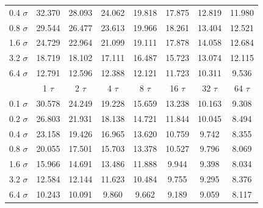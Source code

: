 \documentclass[preprint,12pt]{elsarticle}
\begin{document}
\begin{table}
\begin{tabular}{c || c c c c c c c}
0.4 $\sigma$	&	32.370 	&	28.093 	&	24.062 	&	19.818 	&	17.875 	&	 12.819 	&	11.980 	\\
0.8 $\sigma$	&	29.544 	&	26.477 	&	23.613 	&	19.966 	&	18.261 	&	 13.404 	&	12.521 	\\
1.6 $\sigma$	&	24.729 	&	22.964 	&	21.099 	&	19.111 	&	17.878 	&	 14.058 	&	12.684 	\\
3.2 $\sigma$	&	18.719 	&	18.102 	&	17.111 	&	16.487 	&	15.723 	&	 13.074 	&	12.115 	\\
6.4 $\sigma$	&	12.791 	&	12.596 	&	12.388 	&	12.121 	&	11.723 	&	 10.311 	&	9.536 	\\
\hline
\hline			
	&	1 $\tau$	&	2 $\tau$	&	4 $\tau$	&	8 $\tau$	&	16 $\tau$	 &	32 $\tau$	&	64 $\tau$	\\
\hline
0.1 $\sigma$	&	30.578 	&	24.249 	&	19.228 	&	15.659 	&	13.238 	&	 10.163 	&	9.308 	\\
0.2 $\sigma$	&	26.803 	&	21.931 	&	18.138 	&	14.721 	&	11.844 	&	 10.045 	&	8.494 	\\
0.4 $\sigma$	&	23.158 	&	19.426 	&	16.965 	&	13.620 	&	10.759 	&	 9.742 	&	8.355 	\\
0.8 $\sigma$	&	20.055 	&	17.501 	&	15.703 	&	13.378 	&	10.527 	&	 9.796 	&	8.069 	\\
1.6 $\sigma$	&	15.966 	&	14.691 	&	13.486 	&	11.888 	&	9.944 	&	 9.398 	&	8.034 	\\
3.2 $\sigma$	&	12.584 	&	12.144 	&	11.623 	&	10.484 	&	9.755 	&	 9.295 	&	8.376 	\\
6.4 $\sigma$	&	10.243 	&	10.091 	&	9.860 	&	9.662 	&	9.189 	&	 9.059 	&	8.117 	\\
\hline

\end{tabular}
\end{table}
\end{document}
